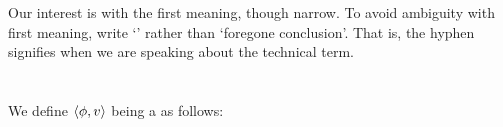 \begin{note}
  Our interest is with the first meaning, though narrow.
  To avoid ambiguity with first meaning, write `' rather than `foregone conclusion'.
  That is, the hyphen signifies when we are speaking about the technical term.
\end{note}

\section{}
\label{cha:sec:fcs-def}

\begin{note}[\fc{2} definition]
  We define \(\langle \phi, v \rangle\) being a \emph{} as follows:

  \begin{definition}[\fc{3}]
    \label{def:fc}


\end{definition}
\end{note}
